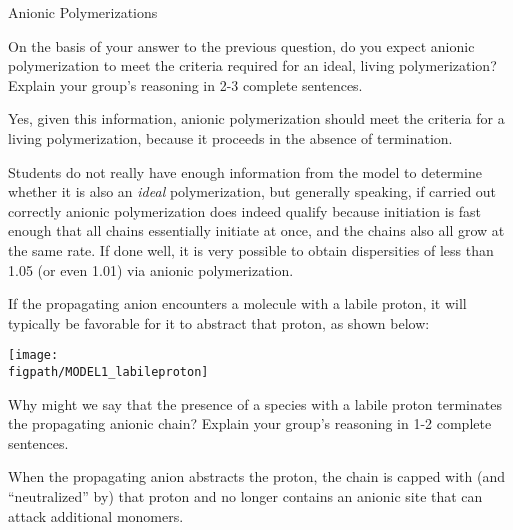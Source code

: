 \begin{activity}{Anionic Polymerizations}
\begin{ctqs}
	\question On the basis of your answer to the previous question, do you expect anionic polymerization to meet the criteria required for an ideal, living polymerization?  Explain your group's reasoning in 2-3 complete sentences.
	
		\begin{solution}[1.25in]
			Yes, given this information, anionic polymerization should meet the criteria for a living polymerization, because it proceeds in the absence of termination.
			
			Students do not really have enough information from the model to determine whether it is also an \textit{ideal} polymerization, but generally speaking, if carried out correctly anionic polymerization does indeed qualify because initiation is fast enough that all chains essentially initiate at once, and the chains also all grow at the same rate.  If done well, it is very possible to obtain dispersities of less than 1.05 (or even 1.01) via anionic polymerization.
		\end{solution}

\end{ctqs}

\begin{infobox}

	If the propagating anion encounters a molecule with a labile proton, it will typically be favorable for it to abstract that proton, as shown below:
	
	\centerline{\texttt{[image: \\figpath/MODEL1\_labileproton]}}
	
\end{infobox}

\begin{ctqs}
	
	
	\question Why might we say that the presence of a species with a labile proton terminates the propagating anionic chain?  Explain your group's reasoning in 1-2 complete sentences.
	
		\begin{solution}[1in]
			When the propagating anion abstracts the proton, the chain is capped with (and ``neutralized'' by) that proton and no longer contains an anionic site that can attack additional monomers.
		\end{solution}
	

\end{ctqs}
\end{activity}
